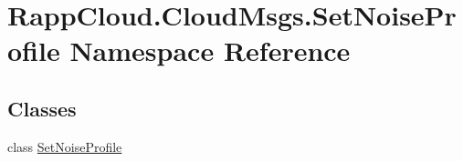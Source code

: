 \hypertarget{namespaceRappCloud_1_1CloudMsgs_1_1SetNoiseProfile}{\section{Rapp\-Cloud.\-Cloud\-Msgs.\-Set\-Noise\-Profile Namespace Reference}
\label{namespaceRappCloud_1_1CloudMsgs_1_1SetNoiseProfile}
}
\subsection*{Classes}
\begin{DoxyCompactItemize}
\item 
class \hyperlink{classRappCloud_1_1CloudMsgs_1_1SetNoiseProfile_1_1SetNoiseProfile}{Set\-Noise\-Profile}
\end{DoxyCompactItemize}
